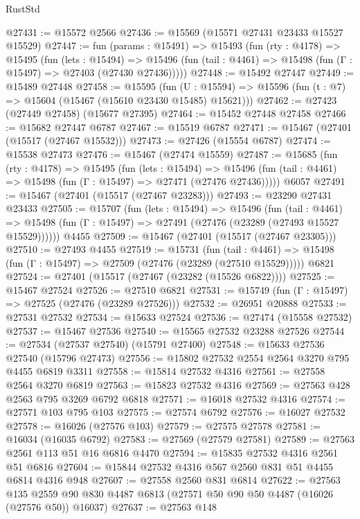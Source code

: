\begin{lexlean}{RustStd}
\begin{coremodule}
@27431 := @15572 @2566
@27436 := @15569 (@15571 @27431 @23433 @15527 @15529)
@27447 := fun (params : @15491) =>
  @15493
    (fun (rty : @4178) =>
    @15495
      (fun (lets : @15494) =>
      @15496 (fun (tail : @4461) => @15498 (fun (Γ : @15497) => @27403 (@27430 @27436)))))
@27448 := @15492 @27447
@27449 := @15489 @27448
@27458 := @15595
    (fun (U : @15594) => @15596 (fun (t : @7) => @15604 (@15467 (@15610 @23430 @15485) @15621)))
@27462 := @27423 (@27449 @27458) (@15677 @27395)
@27464 := @15452 @27448 @27458
@27466 := @15682 @27447 @6787
@27467 := @15519 @6787
@27471 := @15467 (@27401 (@15517 (@27467 @15532)))
@27473 := @27426 (@15554 @6787)
@27474 := @15538 @27473
@27476 := @15467 (@27474 @15559)
@27487 := @15685
    (fun (rty : @4178) =>
    @15495
      (fun (lets : @15494) =>
      @15496 (fun (tail : @4461) => @15498 (fun (Γ : @15497) => @27471 (@27476 @27436)))))
    @6057
@27491 := @15467 (@27401 (@15517 (@27467 @23283)))
@27493 := @23290 @27431 @23433
@27505 := @15707
    (fun (lets : @15494) =>
    @15496
      (fun (tail : @4461) =>
      @15498 (fun (Γ : @15497) => @27491 (@27476 (@23289 (@27493 @15527 @15529))))))
    @4455
@27509 := @15467 (@27401 (@15517 (@27467 @23305)))
@27510 := @27493 @4455
@27519 := @15731
    (fun (tail : @4461) => @15498 (fun (Γ : @15497) => @27509 (@27476 (@23289 (@27510 @15529)))))
    @6821
@27524 := @27401 (@15517 (@27467 (@23282 (@15526 @6822))))
@27525 := @15467 @27524
@27526 := @27510 @6821
@27531 := @15749 (fun (Γ : @15497) => @27525 (@27476 (@23289 @27526)))
@27532 := @26951 @20888
@27533 := @27531 @27532
@27534 := @15633 @27524
@27536 := @27474 (@15558 @27532)
@27537 := @15467 @27536
@27540 := @15565 @27532 @23288 @27526
@27544 := @27534 (@27537 @27540) (@15791 @27400)
@27548 := @15633 @27536 @27540 (@15796 @27473)
@27556 := @15802 @27532 @2554 @2564 @3270 @795 @4455 @6819 @3311
@27558 := @15814 @27532 @4316
@27561 := @27558 @2564 @3270 @6819
@27563 := @15823 @27532 @4316
@27569 := @27563 @428 @2563 @795 @3269 @6792 @6818
@27571 := @16018 @27532 @4316
@27574 := @27571 @103 @795 @103
@27575 := @27574 @6792
@27576 := @16027 @27532
@27578 := @16026 (@27576 @103)
@27579 := @27575 @27578
@27581 := @16034 (@16035 @6792)
@27583 := @27569 (@27579 @27581)
@27589 := @27563 @2561 @113 @51 @16 @6816 @4470
@27594 := @15835 @27532 @4316 @2561 @51 @6816
@27604 := @15844 @27532 @4316 @567 @2560 @831 @51 @4455 @6814 @4316 @948
@27607 := @27558 @2560 @831 @6814
@27622 := @27563
    @135
    @2559
    @90
    @830
    @4487
    @6813
    (@27571 @50 @90 @50 @4487 (@16026 (@27576 @50)) @16037)
@27637 := @27563
    @148

\end{coremodule}
\end{lexlean}
